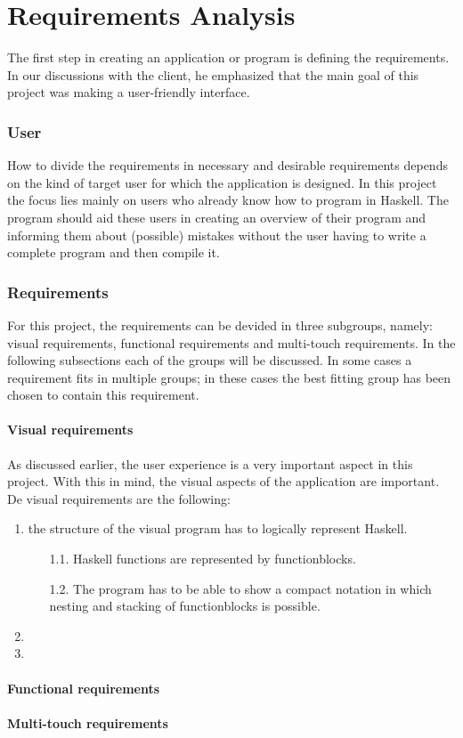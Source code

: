 \chapter{Requirements Analysis}

The first step in creating an application or program is defining the requirements. In our discussions with the client, he emphasized that the main goal of this project was making a user-friendly interface.

\subsection{User}

How to divide the requirements in necessary and desirable requirements depends on the kind of target user for which the application is designed. 
In this project the focus lies mainly on users who already know how to program in Haskell.
The program should aid these users in creating an overview of their program and informing them about (possible) mistakes without the user having to write a complete program and then compile it.

\subsection{Requirements}
For this project, the requirements can be devided in three subgroups, namely: visual requirements, functional requirements and multi-touch requirements. In the following subsections each of the groups will be discussed. In some cases a requirement fits in multiple groups; in these cases the best fitting group has been chosen to contain this requirement.

\subsubsection{Visual requirements} 

As discussed earlier, the user experience is a very important aspect in this project. With this in mind, the visual aspects of the application are important. De visual requirements are the following:

\begin{enumerate}
 \item the structure of the visual program has to logically represent Haskell.
 \begin{enumerate}
 \item[1.1.] Haskell functions are represented by functionblocks.
 \item[1.2.] The program has to be able to show a compact notation in which nesting and stacking of functionblocks is possible.
 \end{enumerate}
 \item
 \item
\end{enumerate}

\subsubsection{Functional requirements}

\subsubsection{Multi-touch requirements}
